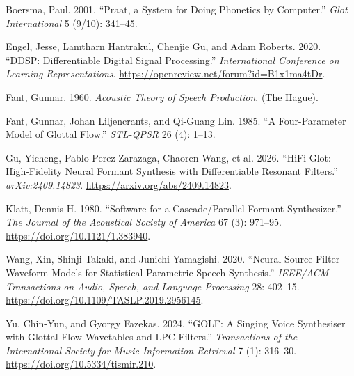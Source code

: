 \documentclass[
  10pt,
]{article}
\newlength{\cslhangindent}
\newenvironment{CSLReferences}[2] %
 {\begin{list}{}{%
  \setlength{\itemindent}{0pt}
  \setlength{\leftmargin}{0pt}
  \setlength{\parsep}{0pt}
  \ifodd #1
   \setlength{\leftmargin}{\cslhangindent}
   \setlength{\itemindent}{-1\cslhangindent}
  \fi
  \setlength{\itemsep}{#2\baselineskip}}}
 {\end{list}}
\begin{document}
\protect{}\label{refs}
\begin{CSLReferences}{1}{1}
Boersma, Paul. 2001. {``Praat, a System for Doing Phonetics by
Computer.''} \emph{Glot International} 5 (9/10): 341--45.

Engel, Jesse, Lamtharn Hantrakul, Chenjie Gu, and Adam Roberts. 2020.
{``DDSP: Differentiable Digital Signal Processing.''}
\emph{International Conference on Learning Representations}.
\url{https://openreview.net/forum?id=B1x1ma4tDr}.

Fant, Gunnar. 1960. \emph{Acoustic Theory of Speech Production}. (The
Hague).

Fant, Gunnar, Johan Liljencrants, and Qi-Guang Lin. 1985. {``A
Four-Parameter Model of Glottal Flow.''} \emph{STL-QPSR} 26 (4): 1--13.

Gu, Yicheng, Pablo Perez Zarazaga, Chaoren Wang, et al. 2026.
{``HiFi-Glot: High-Fidelity Neural Formant Synthesis with Differentiable
Resonant Filters.''} \emph{arXiv:2409.14823}.
\url{https://arxiv.org/abs/2409.14823}.

Klatt, Dennis H. 1980. {``Software for a Cascade/Parallel Formant
Synthesizer.''} \emph{The Journal of the Acoustical Society of America}
67 (3): 971--95. \url{https://doi.org/10.1121/1.383940}.

Wang, Xin, Shinji Takaki, and Junichi Yamagishi. 2020. {``Neural
Source-Filter Waveform Models for Statistical Parametric Speech
Synthesis.''} \emph{IEEE/ACM Transactions on Audio, Speech, and Language
Processing} 28: 402--15.
\url{https://doi.org/10.1109/TASLP.2019.2956145}.

Yu, Chin-Yun, and Gyorgy Fazekas. 2024. {``GOLF: A Singing Voice
Synthesiser with Glottal Flow Wavetables and LPC Filters.''}
\emph{Transactions of the International Society for Music Information
Retrieval} 7 (1): 316--30. \url{https://doi.org/10.5334/tismir.210}.

\end{CSLReferences}
\end{document}
